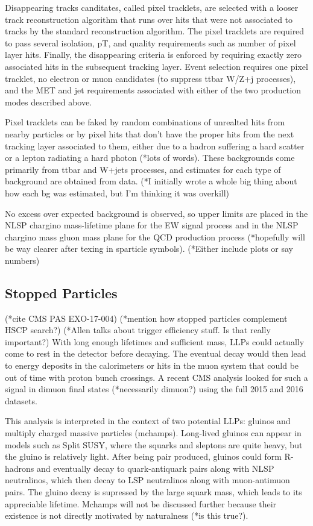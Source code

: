 \documentclass[12pt]{article}
\begin{document}
            Disappearing tracks canditates, called pixel tracklets, are selected with a looser track reconstruction algorithm that runs over hits that were not associated to tracks by the standard reconstruction algorithm. The pixel tracklets are required to pass several isolation, pT, and quality requirements such as number of pixel layer hits. Finally, the disappearing criteria is enforced by requiring exactly zero associated hits in the subsequent tracking layer. Event selection requires one pixel tracklet, no electron or muon candidates (to suppress ttbar W/Z+j processes), and the MET and jet requirements associated with either of the two production modes described above.
            
            Pixel tracklets can be faked by random combinations of unrealted hits from nearby particles or by pixel hits that don't have the proper hits from the next tracking layer associated to them, either due to a hadron suffering a hard scatter or a lepton radiating a hard photon (*lots of words). These backgrounds come primarily from ttbar and W+jets processes, and estimates for each type of background are obtained from data. (*I initially wrote a whole big thing about how each bg was estimated, but I'm thinking it was overkill)

            No excess over expected background is observed, so upper limits are placed in the NLSP chargino mass-lifetime plane for the EW signal process and in the NLSP chargino mass gluon mass plane for the QCD production process (*hopefully will be way clearer after texing in sparticle symbols). (*Either include  plots or say numbers)

\subsection{Stopped Particles}
            (*cite CMS PAS EXO-17-004)
            (*mention how stopped particles complement HSCP search?)
            (*Allen talks about trigger efficiency stuff. Is that really important?)
            With long enough lifetimes and sufficient mass, LLPs could actually come to rest in the detector before decaying. The eventual decay would then lead to energy deposits in the calorimeters or hits in the muon system that could be out of time with proton bunch crossings. A recent CMS analysis looked for such a signal in dimuon final states (*necessarily dimuon?) using the full 2015 and 2016 datasets. 

            This analysis is interpreted in the context of two potential LLPs: gluinos and multiply charged massive particles (mchamps). Long-lived gluinos can appear in models such as Split SUSY, where the squarks and sleptons are quite heavy, but the gluino is relatively light. After being pair produced, gluinos could form R-hadrons and eventually decay to quark-antiquark pairs along with NLSP neutralinos, which then decay to LSP neutralinos along with muon-antimuon pairs. The gluino decay is supressed by the large squark mass, which leads to its appreciable lifetime. Mchamps will not be discussed further because their existence is not directly motivated by naturalness (*is this true?).
\end{document}
